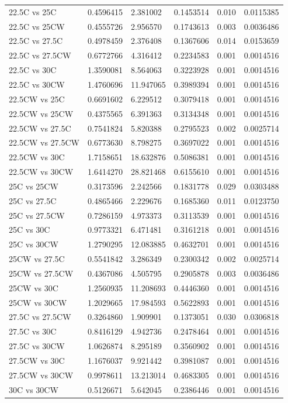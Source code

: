 \documentclass[
]{article}
\begin{document}
\begin{longtable}[]{@{}llllll@{}}
22.5C vs 25C & 0.4596415 & 2.381002 & 0.1453514 & 0.010 & 0.0115385 \\
22.5C vs 25CW & 0.4555726 & 2.956570 & 0.1743613 & 0.003 & 0.0036486 \\
22.5C vs 27.5C & 0.4978459 & 2.376408 & 0.1367606 & 0.014 & 0.0153659 \\
22.5C vs 27.5CW & 0.6772766 & 4.316412 & 0.2234583 & 0.001 &
0.0014516 \\
22.5C vs 30C & 1.3590081 & 8.564063 & 0.3223928 & 0.001 & 0.0014516 \\
22.5C vs 30CW & 1.4760696 & 11.947065 & 0.3989394 & 0.001 & 0.0014516 \\
22.5CW vs 25C & 0.6691602 & 6.229512 & 0.3079418 & 0.001 & 0.0014516 \\
22.5CW vs 25CW & 0.4375565 & 6.391363 & 0.3134348 & 0.001 & 0.0014516 \\
22.5CW vs 27.5C & 0.7541824 & 5.820388 & 0.2795523 & 0.002 &
0.0025714 \\
22.5CW vs 27.5CW & 0.6773630 & 8.798275 & 0.3697022 & 0.001 &
0.0014516 \\
22.5CW vs 30C & 1.7158651 & 18.632876 & 0.5086381 & 0.001 & 0.0014516 \\
22.5CW vs 30CW & 1.6414270 & 28.821468 & 0.6155610 & 0.001 &
0.0014516 \\
25C vs 25CW & 0.3173596 & 2.242566 & 0.1831778 & 0.029 & 0.0303488 \\
25C vs 27.5C & 0.4865466 & 2.229676 & 0.1685360 & 0.011 & 0.0123750 \\
25C vs 27.5CW & 0.7286159 & 4.973373 & 0.3113539 & 0.001 & 0.0014516 \\
25C vs 30C & 0.9773321 & 6.471481 & 0.3161218 & 0.001 & 0.0014516 \\
25C vs 30CW & 1.2790295 & 12.083885 & 0.4632701 & 0.001 & 0.0014516 \\
25CW vs 27.5C & 0.5541842 & 3.286349 & 0.2300342 & 0.002 & 0.0025714 \\
25CW vs 27.5CW & 0.4367086 & 4.505795 & 0.2905878 & 0.003 & 0.0036486 \\
25CW vs 30C & 1.2560935 & 11.208693 & 0.4446360 & 0.001 & 0.0014516 \\
25CW vs 30CW & 1.2029665 & 17.984593 & 0.5622893 & 0.001 & 0.0014516 \\
27.5C vs 27.5CW & 0.3264860 & 1.909901 & 0.1373051 & 0.030 &
0.0306818 \\
27.5C vs 30C & 0.8416129 & 4.942736 & 0.2478464 & 0.001 & 0.0014516 \\
27.5C vs 30CW & 1.0626874 & 8.295189 & 0.3560902 & 0.001 & 0.0014516 \\
27.5CW vs 30C & 1.1676037 & 9.921442 & 0.3981087 & 0.001 & 0.0014516 \\
27.5CW vs 30CW & 0.9978611 & 13.213014 & 0.4683305 & 0.001 &
0.0014516 \\
30C vs 30CW & 0.5126671 & 5.642045 & 0.2386446 & 0.001 & 0.0014516 \\
\end{longtable}
\end{document}
